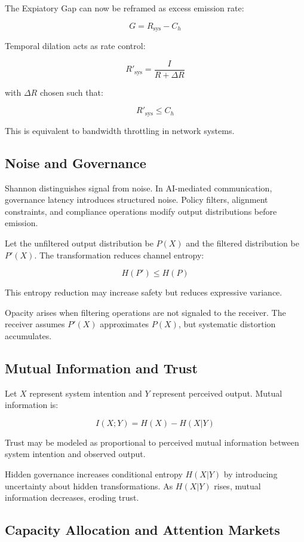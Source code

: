 \documentclass[12pt]{article}
\begin{document}
The Expiatory Gap can now be reframed as excess emission rate:

\[
G = R_{\text{sys}} - C_h
\]

Temporal dilation acts as rate control:

\[
R'_{\text{sys}} = \frac{I}{R + \Delta R}
\]

with $\Delta R$ chosen such that:

\[
R'_{\text{sys}} \le C_h
\]

This is equivalent to bandwidth throttling in network systems.

\subsection*{Noise and Governance}

Shannon distinguishes signal from noise. In AI-mediated communication, governance latency introduces structured noise. Policy filters, alignment constraints, and compliance operations modify output distributions before emission.

Let the unfiltered output distribution be $P(X)$ and the filtered distribution be $P'(X)$. The transformation reduces channel entropy:

\[
H(P') \le H(P)
\]

This entropy reduction may increase safety but reduces expressive variance.

Opacity arises when filtering operations are not signaled to the receiver. The receiver assumes $P'(X)$ approximates $P(X)$, but systematic distortion accumulates.

\subsection*{Mutual Information and Trust}

Let $X$ represent system intention and $Y$ represent perceived output. Mutual information is:

\[
I(X;Y) = H(X) - H(X|Y)
\]

Trust may be modeled as proportional to perceived mutual information between system intention and observed output.

Hidden governance increases conditional entropy $H(X|Y)$ by introducing uncertainty about hidden transformations. As $H(X|Y)$ rises, mutual information decreases, eroding trust.

\subsection*{Capacity Allocation and Attention Markets}
\end{document}
